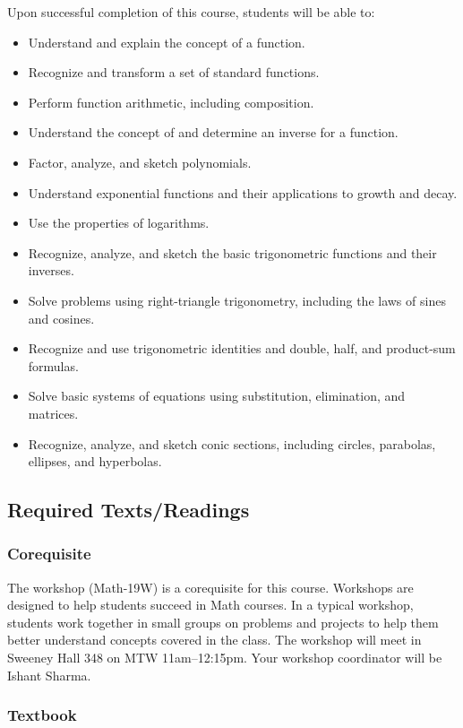 \documentclass[letterpaper,12pt,fleqn]{article}
\begin{document}
Upon successful completion of this course, students will be able to:
\begin{itemize}
\item Understand and explain the concept of a function.
\item Recognize and transform a set of standard functions.
\item Perform function arithmetic, including composition.
\item Understand the concept of and determine an inverse for a function.
\item Factor, analyze, and sketch polynomials.
\item Understand exponential functions and their applications to growth and decay.
\item Use the properties of logarithms.
\item Recognize, analyze, and sketch the basic trigonometric functions and their inverses.
\item Solve problems using right-triangle trigonometry, including the laws of sines and cosines.
\item Recognize and use trigonometric identities and double, half, and product-sum formulas.
\item Solve basic systems of equations using substitution, elimination, and matrices.
\item Recognize, analyze, and sketch conic sections, including circles, parabolas, ellipses, and hyperbolas.
\end{itemize}

\subsection*{Required Texts/Readings}

\subsubsection*{Corequisite}

The workshop (Math-19W) is a corequisite for this course.  Workshops are designed to help students succeed in Math courses.
In a typical workshop, students work together in small groups on problems and projects to help them better understand
concepts covered in the class.  The workshop will meet in Sweeney Hall 348 on MTW 11am--12:15pm.  Your workshop
coordinator will be Ishant Sharma.

\subsubsection*{Textbook}
\end{document}
